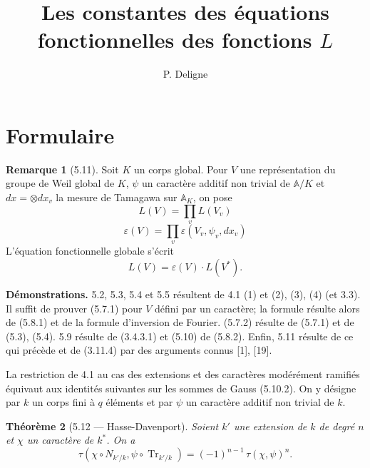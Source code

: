 \documentclass[11pt]{amsart}
\theoremstyle{plain}
\newtheorem{theorem}{Th\'eor\`eme}[section]
\theoremstyle{definition}
\newtheorem{remark}[theorem]{Remarque}
\begin{document}
\title{Les constantes des \'equations fonctionnelles des fonctions $L$}
\author{P. Deligne}
\maketitle

\setcounter{section}{4}

\section{Formulaire}
\setcounter{theorem}{10}

\begin{remark}[5.11]
Soit $K$ un corps global. Pour $V$ une repr\'esentation du groupe de Weil global de $K$, $\psi$ un caract\`ere additif non trivial de $\mathbb{A}/K$ et $dx = \otimes dx_v$ la mesure de Tamagawa sur $\mathbb{A}_K$, on pose
\begin{equation}
L(V) = \prod_v L(V_v)
\tag{5.11.0}
\end{equation}
\begin{equation}
\varepsilon(V) = \prod_v \varepsilon(V_v, \psi_v, dx_v)
\tag{5.11.1}
\end{equation}
L'\'equation fonctionnelle globale s'\'ecrit
\begin{equation}
L(V) = \varepsilon(V) \cdot L(V^*).
\tag{5.11.2}
\end{equation}
\end{remark}

\noindent\textbf{D\'emonstrations.} 5.2, 5.3, 5.4 et 5.5 r\'esultent de 4.1 (1) et (2), (3), (4) (et 3.3). Il suffit de prouver (5.7.1) pour $V$ d\'efini par un caract\`ere; la formule r\'esulte alors de (5.8.1) et de la formule d'inversion de Fourier. (5.7.2) r\'esulte de (5.7.1) et de (5.3), (5.4). 5.9 r\'esulte de (3.4.3.1) et (5.10) de (5.8.2). Enfin, 5.11 r\'esulte de ce qui pr\'ec\`ede et de (3.11.4) par des arguments connus [1], [19].

La restriction de 4.1 au cas des extensions et des caract\`eres mod\'er\'ement ramifi\'es \'equivaut aux identit\'es suivantes sur les sommes de Gauss (5.10.2). On y d\'esigne par $k$ un corps fini \`a $q$ \'el\'ements et par $\psi$ un caract\`ere additif non trivial de $k$.

\begin{theorem}[5.12 --- Hasse-Davenport]
Soient $k'$ une extension de $k$ de degr\'e $n$ et $\chi$ un caract\`ere de $k^*$. On a
\[
\tau(\chi \circ N_{k'/k}, \psi \circ \operatorname{Tr}_{k'/k}) = (-1)^{n-1} \, \tau(\chi, \psi)^n.
\]
\end{theorem}
\end{document}
